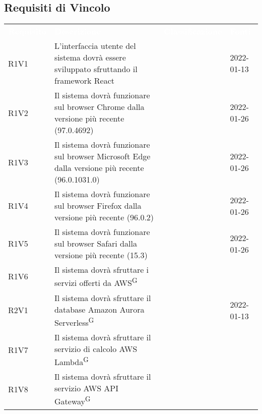 \subsection{Requisiti di Vincolo}


\renewcommand{\arraystretch}{1.5}
\begin{longtable}{ m{}<{\centering}  m{}<{\centering}  m{}<{\centering}  m{}<{\centering}}
	\rowcolor{darkblue}
	\textcolor{white}{\textbf{Requisito}} &\textcolor{white}{\textbf{Descrizione}}& \textcolor{white}{\textbf{Classificazione}} & \textcolor{white}{\textbf{Fonti}}\\ 

	R1V1 & L’interfaccia utente del sistema dovrà essere sviluppato sfruttando il framework React & \Ob & \Vi{} 2022-01-13 \\	

	R1V2 & Il sistema dovrà funzionare sul browser Chrome dalla versione più recente (97.0.4692) & \Ob & \Ve{} 2022-01-26 \\	
	 
	R1V3 & Il sistema dovrà funzionare sul browser Microsoft Edge dalla versione più recente (96.0.1031.0) & \Ob & \Ve{} 2022-01-26 \\	

	R1V4 & Il sistema dovrà funzionare sul browser Firefox dalla versione più recente (96.0.2) & \Ob & \Ve{} 2022-01-26 \\	
	 
	R1V5 & Il sistema dovrà funzionare sul browser Safari dalla versione più recente (15.3) & \Ob & \Ve{} 2022-01-26 \\	
	 
	R1V6 & Il sistema dovrà sfruttare i servizi offerti da AWS\textsuperscript{G} & \Ob & \Ca \\	
	 
	R2V1 & Il sistema dovrà sfruttare il database Amazon Aurora Serverless\textsuperscript{G} & \De & \Vi{} 2022-01-13 \\
	
	R1V7 & Il sistema dovrà sfruttare il servizio di calcolo AWS Lambda\textsuperscript{G} & \Ob & \Ca \\	
	 
	R1V8 & Il sistema dovrà sfruttare il servizio AWS API Gateway\textsuperscript{G} & \Ob & \Ca \\
	

\end{longtable}
